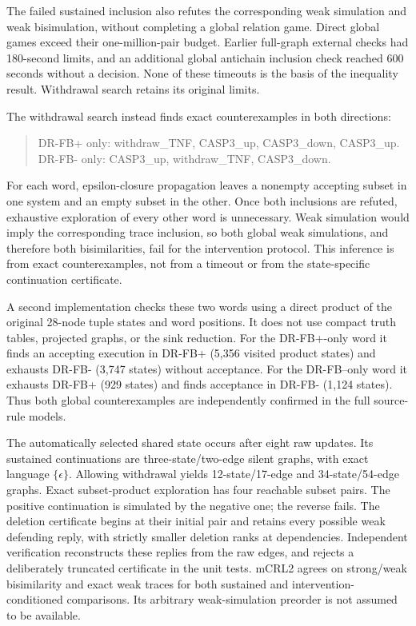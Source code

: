 The failed sustained inclusion also refutes the corresponding weak simulation
and weak bisimulation, without completing a global relation game. Direct
global games exceed their one-million-pair budget. Earlier full-graph external
checks had 180-second limits, and an additional global antichain inclusion
check reached 600 seconds without a decision. None of these timeouts is the
basis of the inequality result. Withdrawal search retains its original limits.

The withdrawal search instead finds exact counterexamples in both directions:
\begin{quote}\small
DR-FB+ only: withdraw\_TNF, CASP3\_up, CASP3\_down, CASP3\_up.\\
DR-FB- only: CASP3\_up, withdraw\_TNF, CASP3\_down.
\end{quote}
For each word, epsilon-closure propagation leaves a nonempty accepting subset
in one system and an empty subset in the other. Once both inclusions are
refuted, exhaustive exploration of every other word is unnecessary. Weak
simulation would imply the corresponding trace inclusion, so both global weak
simulations, and therefore both bisimilarities, fail for the intervention
protocol. This inference is from exact counterexamples, not from a timeout or
from the state-specific continuation certificate.

A second implementation checks these two words using a direct product of the
original 28-node tuple states and word positions. It does not use compact
truth tables, projected graphs, or the sink reduction. For the DR-FB+-only
word it finds an accepting execution in DR-FB+ (5,356 visited product states)
and exhausts DR-FB- (3,747 states) without acceptance. For the DR-FB--only word
it exhausts DR-FB+ (929 states) and finds acceptance in DR-FB- (1,124 states).
Thus both global counterexamples are independently confirmed in the full
source-rule models.

The automatically selected shared state occurs after eight raw updates. Its
sustained continuations are three-state/two-edge silent graphs, with exact
language $\{\epsilon\}$. Allowing withdrawal yields 12-state/17-edge and
34-state/54-edge graphs. Exact subset-product exploration has four reachable
subset pairs. The positive continuation is simulated by the negative one;
the reverse fails. The deletion certificate begins at their initial pair and
retains every possible weak defending reply, with strictly smaller deletion
ranks at dependencies. Independent verification reconstructs these replies
from the raw edges, and rejects a deliberately truncated certificate in the
unit tests. mCRL2 agrees on strong/weak bisimilarity and exact weak traces for
both sustained and intervention-conditioned comparisons. Its arbitrary
weak-simulation preorder is not assumed to be available.


